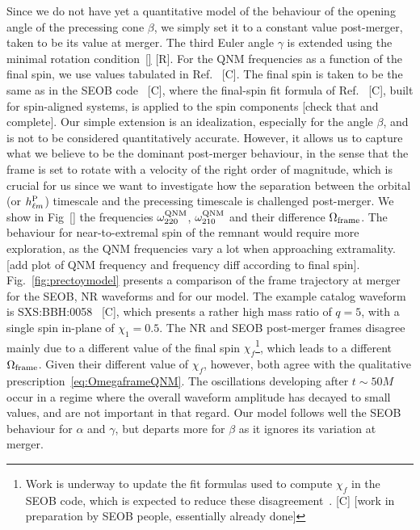 \documentclass[aps,showpacs,twocolumn,
prd,superscriptaddress,nofootinbib]{revtex4-1}
\newcommand{\SM}[1]{{\color{Red} #1}}
\begin{document}
Since we do not have yet a quantitative model of the behaviour of the opening angle of the precessing cone $\beta$, we simply set it to a constant value post-merger, taken to be its value at merger. The third Euler angle $\gamma$ is extended using the minimal rotation condition~\eqref{} \SM{[R]}. For the QNM frequencies as a function of the final spin, we use values tabulated in Ref.~\cite{} \SM{[C]}. The final spin is taken to be the same as in the SEOB code~\cite{} \SM{[C]}, where the final-spin fit formula of Ref.~\cite{} \SM{[C]}, built for spin-aligned systems, is applied to the spin components \SM{[check that and complete]}. Our simple extension is an idealization, especially for the angle $\beta$, and is not to be considered quantitatively accurate. However, it allows us to capture what we believe to be the dominant post-merger behaviour, in the sense that the frame is set to rotate with a velocity of the right order of magnitude, which is crucial for us since we want to investigate how the separation between the orbital (or $h^{\rm P}_{\ell m}$) timescale and the precessing timescale is challenged post-merger. We show in Fig~\ref{} the frequencies $\omega_{220}^{\rm QNM}$, $\omega_{210}^{\rm QNM}$ and their difference $\Omega_{\rm frame}$. The behaviour for near-to-extremal spin of the remnant would require more exploration, as the QNM frequencies vary a lot when approaching extramality. \SM{[add plot of QNM frequency and frequency diff according to final spin]}.  Fig.~\ref{fig:prectoymodel} presents a comparison of the frame trajectory at merger for the SEOB, NR waveforms and for our model. The example catalog waveform is SXS:BBH:0058~\cite{} \SM{[C]}, which presents a rather high mass ratio of $q=5$, with a single spin in-plane of $\chi_{1} = 0.5$. The NR and SEOB post-merger frames disagree mainly due to a different value of the final spin $\chi_{f}$\footnote{Work is underway to update the fit formulas used to compute $\chi_{f}$ in the SEOB code, which is expected to reduce these disagreement~\cite{}. \SM{[C]} \SM{[work in preparation by SEOB people, essentially already done]}}, which leads to a different $\Omega_{\rm frame}$. Given their different value of $\chi_{f}$, however, both agree with the qualitative prescription~\eqref{eq:OmegaframeQNM}. The oscillations developing after $t\sim 50 M$ occur in a regime where the overall waveform amplitude has decayed to small values, and are not important in that regard. Our model follows well the SEOB behaviour for $\alpha$ and $\gamma$, but departs more for $\beta$ as it ignores its variation at merger. 
\end{document}
